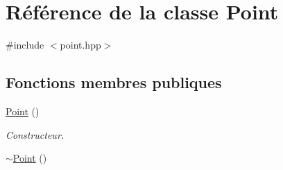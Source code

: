 \hypertarget{class_point}{\section{Référence de la classe Point}
\label{class_point}
}


{\ttfamily \#include $<$point.\-hpp$>$}

\subsection*{Fonctions membres publiques}
\begin{DoxyCompactItemize}
\item 
\hypertarget{class_point_ad92f2337b839a94ce97dcdb439b4325a}{\hyperlink{class_point_ad92f2337b839a94ce97dcdb439b4325a}{Point} ()}\label{class_point_ad92f2337b839a94ce97dcdb439b4325a}

\begin{DoxyCompactList}\small\item\em Constructeur. \end{DoxyCompactList}\item 
\hypertarget{class_point_a395fa04b4ec126b66fc053f829a30cc1}{\hyperlink{class_point_a395fa04b4ec126b66fc053f829a30cc1}{$\sim$\-Point} ()}\label{class_point_a395fa04b4ec126b66fc053f829a30cc1}


\end{DoxyCompactItemize}
